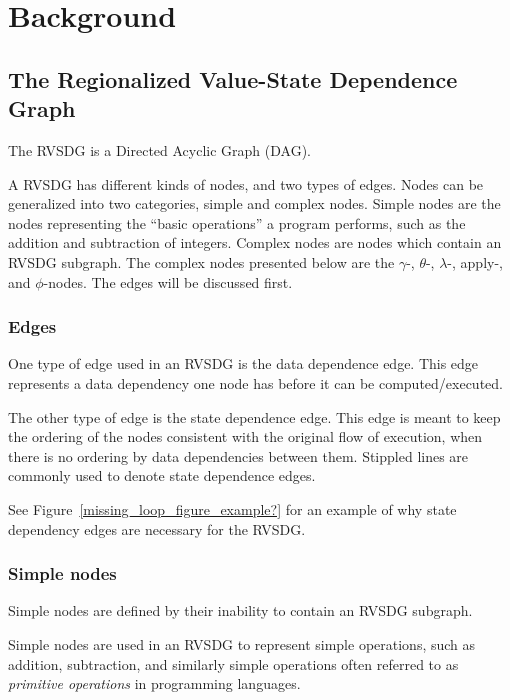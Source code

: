 
\clearpage
\section{Background}
\label{background}

\subsection{The Regionalized Value-State Dependence Graph}
\label{background:RVSDG}

The RVSDG is a Directed Acyclic Graph (DAG).

A RVSDG has different kinds of nodes, and two types of edges. Nodes can be
generalized into two categories, simple and complex nodes. Simple nodes are the
nodes representing the ``basic operations'' a program performs, such as the
addition and subtraction of integers. Complex nodes are nodes which contain an
RVSDG subgraph. The complex nodes presented below are the $\gamma$-, $\theta$-,
$\lambda$-, apply-, and $\phi$-nodes. The edges will be discussed first.

\subsubsection{Edges}

One type of edge used in an RVSDG is the data dependence edge. This edge
represents a data dependency one node has before it can be computed/executed.

The other type of edge is the state dependence edge. This edge is meant to keep
the ordering of the nodes consistent with the original flow of execution, when
there is no ordering by data dependencies between them. Stippled lines are
commonly used to denote state dependence edges.


See Figure~\ref{missing_loop_figure_example?} for an example of why state
dependency edges are necessary for the RVSDG.

\subsubsection{Simple nodes}

Simple nodes are defined by their inability to contain an RVSDG subgraph.

Simple nodes are used in an RVSDG to represent simple operations, such as
addition, subtraction, and similarly simple operations often referred to as
\textit{primitive operations} in programming languages.

